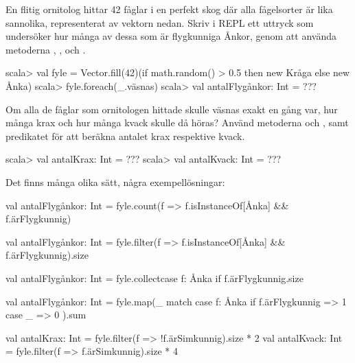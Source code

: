 \Subtask En flitig ornitolog hittar 42 fåglar i en perfekt skog där alla fågelsorter är lika sannolika, representerat av vektorn  nedan. Skriv i REPL ett uttryck som undersöker hur många av dessa som är flygkunniga Ånkor, genom att använda metoderna , ,  och .

\begin{REPL}
scala> val fyle =
         Vector.fill(42)(if math.random() > 0.5 then new Kråga else new Ånka)
scala> fyle.foreach(_.väsnas)
scala> val antalFlygånkor: Int = ???
\end{REPL}

\Subtask \label{subtask:fyle:sound} Om alla de fåglar som ornitologen hittade skulle väsnas exakt en gång var, hur många krax och hur många kvack skulle då höras? Använd metoderna  och , samt predikatet  för att beräkna antalet krax respektive kvack.
\begin{REPL}
scala> val antalKrax: Int = ???
scala> val antalKvack: Int = ???
\end{REPL}

\SOLUTION


\TaskSolved \what


\SubtaskSolved
Det finns många olika sätt, några exempellösningar:
\begin{Code}
val antalFlygånkor: Int = 
  fyle.count(f => f.isInstanceOf[Ånka] && f.ärFlygkunnig)
\end{Code}

\begin{Code}
val antalFlygånkor: Int = 
  fyle.filter(f => f.isInstanceOf[Ånka] && f.ärFlygkunnig).size
\end{Code}

\begin{Code}
val antalFlygånkor: Int = 
  fyle.collect{case f: Ånka if f.ärFlygkunnig}.size
\end{Code}

\begin{Code}
val antalFlygånkor: Int = fyle.map(_ match
  case f: Ånka if f.ärFlygkunnig => 1
  case _ => 0
).sum
\end{Code}

\SubtaskSolved
\begin{Code}
val antalKrax: Int = fyle.filter(f => !f.ärSimkunnig).size * 2
val antalKvack: Int = fyle.filter(f => f.ärSimkunnig).size * 4
\end{Code}


\QUESTEND











